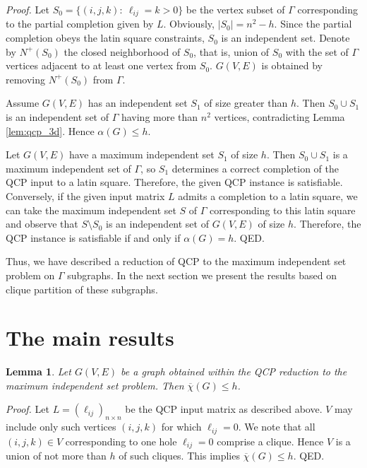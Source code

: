 \documentclass[11pt]{article}
\newtheorem{lem}{Lemma}
\begin{document}
{\em Proof.\/} Let $S_0=\{(i,j,k): \ \ell_{ij}=k>0\}$ be the vertex subset of 
$\Gamma$ corresponding to the partial completion given by $L$. Obviously, 
$|S_0|=n^2-h$. Since the partial completion obeys the latin square constraints, 
$S_0$ is an independent set. Denote by $N^{+}(S_0)$ the closed neighborhood of 
$S_0$, that is, union of $S_0$ with the set of $\Gamma$ vertices adjacent to at 
least one vertex from $S_0$. $G(V,E)$ is obtained by removing $N^{+}(S_0)$ from 
$\Gamma$.

Assume $G(V,E)$ has an independent set $S_1$ of size greater than $h$. Then
$S_0 \cup S_1$ is an independent set of $\Gamma$ having more than $n^2$ vertices, 
contradicting Lemma \ref{lem:qcp_3d}. Hence $\alpha(G) \leq h$.

Let $G(V,E)$ have a maximum independent set $S_1$ of size $h$. Then $S_0 \cup S_1$
is a maximum independent set of $\Gamma$, so $S_1$ determines a correct 
completion of the QCP input to a latin square. Therefore, the given QCP instance 
is satisfiable. Conversely, if the given input matrix $L$ admits a completion to 
a latin square, we can take the maximum independent set $S$ of $\Gamma$ 
corresponding to this latin square and observe that $S \setminus S_0$ is an 
independent set of $G(V,E)$ of size $h$. Therefore, the QCP instance is 
satisfiable if and only if $\alpha(G)=h$. QED.

\vspace{1pc}

Thus, we have described a reduction of QCP to the maximum independent set 
problem on $\Gamma$ subgraphs. In the next section we present the results based 
on clique partition of these subgraphs.

\section{The main results}
\begin{lem}
\label{lem:qcp_chi}
Let $G(V,E)$ be a graph obtained within the QCP reduction to the maximum 
independent set problem. Then $\overline{\chi}(G) \le h$.
\end{lem}

{\em Proof.\/} Let $L=(\ell_{ij})_{n \times n}$ be the QCP input matrix as 
described above. $V$ may include only such vertices $(i,j,k)$ for which 
$\ell_{ij}=0$. We note that all $(i,j,k) \in V$ corresponding to one hole 
$\ell_{ij}=0$ comprise a clique. Hence $V$ is a union of not more than $h$ of 
such cliques. This implies $\overline{\chi}(G) \le h$. QED.
\end{document}
